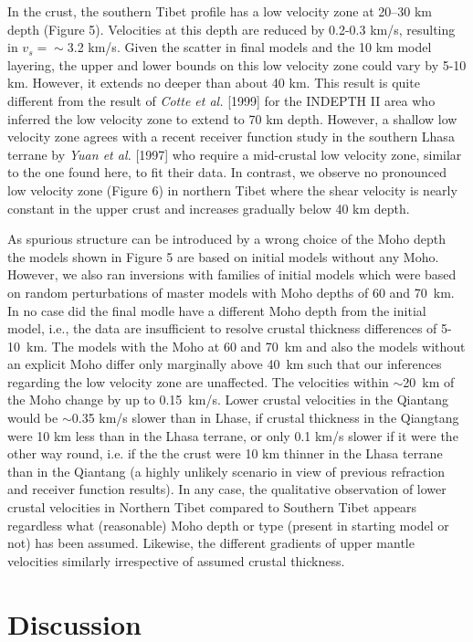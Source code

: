 \documentclass[12pt]{article}
\begin{document}
In the crust, the southern Tibet profile has a low velocity zone at 20--30 km depth (Figure 5). 
Velocities at this depth are reduced by 0.2-0.3 km/s, resulting in $v_s=\sim$3.2 km/s.  Given the scatter in final 
models and the 10 km model layering, the upper and lower bounds on this low velocity zone could vary by 
5-10 km. However, it extends no deeper than about 40 km. This result
is quite different from the result of {\it Cotte et al.} [1999] for
the INDEPTH II area who inferred the low velocity zone to extend to 70
km depth.  However, a shallow low velocity zone agrees with a recent
receiver function study in the southern Lhasa terrane by {\it Yuan et 
al.} [1997] who require a mid-crustal low velocity zone, similar to the one found here, to fit their data.  In contrast, we observe no pronounced low velocity zone (Figure 6) in northern Tibet where the shear 
velocity is nearly constant in the upper crust and increases gradually below 40 km depth.  

As spurious structure can be introduced by a wrong choice of the
Moho depth the models shown in Figure 5 are based on initial models
without any Moho.  However, we also ran inversions with families of
initial models which were based on random perturbations of master
models with Moho depths of 60 and 70~km.  In no case did the final
modle have a different Moho depth from the initial model, i.e., the
data are insufficient to resolve crustal thickness differences of
5-10~km.  The models with the Moho at 60 and 70~km and also the models
without an explicit Moho differ only marginally above 40~km such that
our inferences regarding the low velocity zone are unaffected.  The
velocities within $\sim$20~km of the Moho change by up to 0.15~km/s.
Lower crustal velocities in the Qiantang would be $\sim$0.35 km/s
slower than in Lhase, if crustal thickness in the Qiangtang were 10 km
less than in the Lhasa terrane, or only 0.1 km/s slower if it were the
other way round, i.e. if the the crust were 10 km thinner in the Lhasa
terrane than in the Qiantang (a highly unlikely scenario in view of
previous refraction and receiver function results).  In any case, the
qualitative observation of lower crustal velocities in Northern Tibet
compared to Southern Tibet appears regardless what (reasonable) Moho
depth or type (present in starting model or not) has been assumed.  Likewise, the different gradients of upper mantle velocities similarly irrespective of assumed crustal thickness.

\section{Discussion} 
\end{document}

